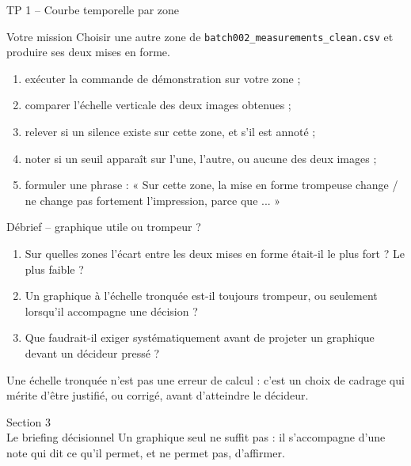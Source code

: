 \documentclass[aspectratio=169]{beamer}
\begin{document}
\begin{frame}{TP 1 -- Courbe temporelle par zone}
  \begin{block}{Votre mission}
    Choisir une autre zone de \texttt{batch002\_measurements\_clean.csv} et produire ses deux mises en forme.
  \end{block}
  \begin{enumerate}
    \item exécuter la commande de démonstration sur votre zone ;
    \item comparer l'échelle verticale des deux images obtenues ;
    \item relever si un silence existe sur cette zone, et s'il est annoté ;
    \item noter si un seuil apparaît sur l'une, l'autre, ou aucune des deux images ;
    \item formuler une phrase : « Sur cette zone, la mise en forme trompeuse change / ne change pas fortement l'impression, parce que ... »
  \end{enumerate}
\end{frame}

\begin{frame}{Débrief -- graphique utile ou trompeur ?}
  \begin{enumerate}
    \item Sur quelles zones l'écart entre les deux mises en forme était-il le plus fort ? Le plus faible ?
    \item Un graphique à l'échelle tronquée est-il toujours trompeur, ou seulement lorsqu'il accompagne une décision ?
    \item Que faudrait-il exiger systématiquement avant de projeter un graphique devant un décideur pressé ?
  \end{enumerate}
  \vfill
  \alert{Une échelle tronquée n'est pas une erreur de calcul : c'est un choix de cadrage qui mérite d'être justifié, ou corrigé, avant d'atteindre le décideur.}
\end{frame}

\begin{frame}[plain]
  \centering
  \Huge Section 3\\[3mm]
  \Large Le briefing décisionnel
  \vfill
  \normalsize Un graphique seul ne suffit pas : il s'accompagne d'une note qui dit ce qu'il permet, et ne permet pas, d'affirmer.
\end{frame}
\end{document}
